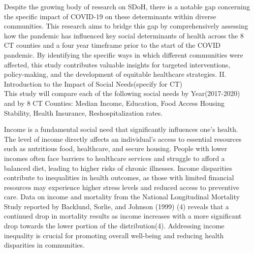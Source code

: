 \documentclass[12pt]{article}
\begin{document}
Despite the growing body of research on SDoH, there is a notable gap concerning the specific impact of COVID-19 on 
these determinants within diverse communities. This research aims to bridge this gap by comprehensively assessing how 
the pandemic has influenced key social determinants of health across the 8 CT counties and a four year timeframe prior to 
the start of the COVID pandemic. 
By identifying the specific ways in which different communities were affected, this study contributes valuable insights 
for targeted interventions, policy-making, and the development of equitable healthcare strategies.
\@
II. Introduction to the Impact of Social Needs(specify for CT)
\\
This study will compare each of the following social needs by Year(2017-2020) and by 8 CT Counties: 
Median Income,
Education,
Food Access
Housing Stability,
Health Insurance,
Reshospitalization rates.

Income is a fundamental
social need that significantly influences
one's health. The level of income
directly affects an individual's access
to essential resources such as nutritious
food, healthcare, and secure housing.
People with lower incomes often face
barriers to healthcare services and
struggle to afford a balanced diet,
leading to higher risks of chronic
illnesses. Income disparities contribute
to inequalities in health outcomes, as
those with limited financial resources
may experience higher stress levels and
reduced access to preventive care. 
Data on income and mortality from the National Longitudinal Mortality Study reported by Backlund, Sorlie, and Johnson (1999) (4)
reveals that a continued drop in mortality results as income increases with a more significant drop towards the lower portion of the distribution(4).
Addressing income inequality is crucial
for promoting overall well-being and
reducing health disparities in communities.
\end{document}
